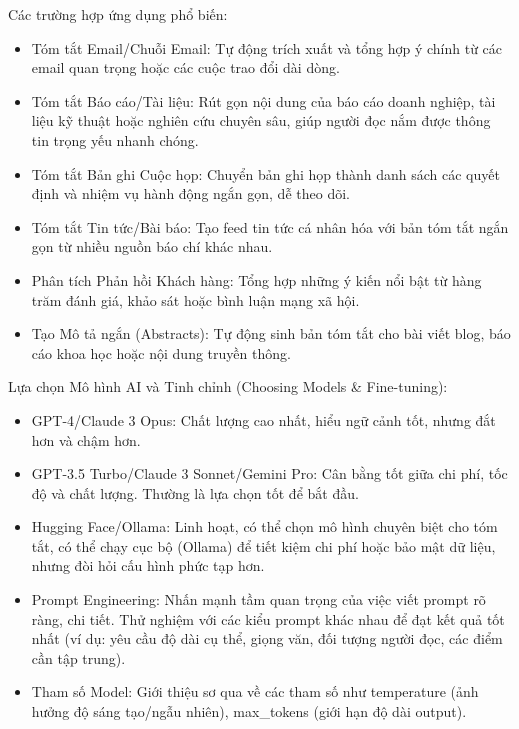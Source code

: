 Các trường hợp ứng dụng phổ biến:

\begin{itemize}
    \item Tóm tắt Email/Chuỗi Email: Tự động trích xuất và tổng hợp ý chính từ các email quan trọng hoặc các cuộc trao đổi dài dòng.

    \item Tóm tắt Báo cáo/Tài liệu: Rút gọn nội dung của báo cáo doanh nghiệp, tài liệu kỹ thuật hoặc nghiên cứu chuyên sâu, giúp người đọc nắm được thông tin trọng yếu nhanh chóng.

    \item Tóm tắt Bản ghi Cuộc họp: Chuyển bản ghi họp thành danh sách các quyết định và nhiệm vụ hành động ngắn gọn, dễ theo dõi.

    \item Tóm tắt Tin tức/Bài báo: Tạo feed tin tức cá nhân hóa với bản tóm tắt ngắn gọn từ nhiều nguồn báo chí khác nhau.

    \item Phân tích Phản hồi Khách hàng: Tổng hợp những ý kiến nổi bật từ hàng trăm đánh giá, khảo sát hoặc bình luận mạng xã hội.

    \item Tạo Mô tả ngắn (Abstracts): Tự động sinh bản tóm tắt cho bài viết blog, báo cáo khoa học hoặc nội dung truyền thông.
\end{itemize}

Lựa chọn Mô hình AI và Tinh chỉnh (Choosing Models \& Fine-tuning):
\begin{itemize}
    \item GPT-4/Claude 3 Opus: Chất lượng cao nhất, hiểu ngữ cảnh tốt, nhưng đắt hơn và chậm hơn.
    \item GPT-3.5 Turbo/Claude 3 Sonnet/Gemini Pro: Cân bằng tốt giữa chi phí, tốc độ và chất lượng. Thường là lựa chọn tốt để bắt đầu.
    \item Hugging Face/Ollama: Linh hoạt, có thể chọn mô hình chuyên biệt cho tóm tắt, có thể chạy cục bộ (Ollama) để tiết kiệm chi phí hoặc bảo mật dữ liệu, nhưng đòi hỏi cấu hình phức tạp hơn.
    \item Prompt Engineering: Nhấn mạnh tầm quan trọng của việc viết prompt rõ ràng, chi tiết. Thử nghiệm với các kiểu prompt khác nhau để đạt kết quả tốt nhất (ví dụ: yêu cầu độ dài cụ thể, giọng văn, đối tượng người đọc, các điểm cần tập trung).
    \item Tham số Model: Giới thiệu sơ qua về các tham số như temperature (ảnh hưởng độ sáng tạo/ngẫu nhiên), max\_tokens (giới hạn độ dài output).
\end{itemize}


